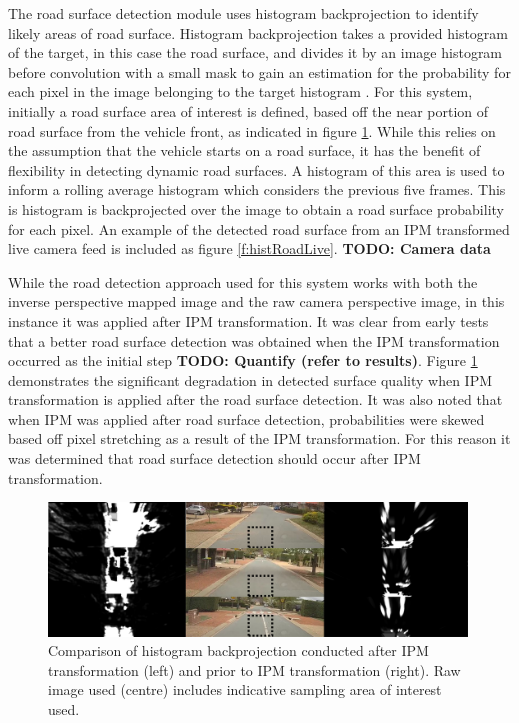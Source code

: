 \documentclass[]{aiaa-tc}%
\begin{document}
The road surface detection module uses histogram backprojection to identify likely areas of road surface. Histogram backprojection takes a provided histogram of the target, in this case the road surface, and divides it by an image histogram before convolution with a small mask to gain an estimation for the probability for each pixel in the image belonging to the target histogram \citep{histBackImageIndexing}. For this system, initially a road surface area of interest is defined, based off the near portion of road surface from the vehicle front, as indicated in figure \ref{f:histIPMcompare}. While this relies on the assumption that the vehicle starts on a road surface, it has the benefit of flexibility in detecting dynamic road surfaces. A histogram of this area is used to inform a rolling average histogram which considers the previous five frames. This is histogram is backprojected over the image to obtain a road surface probability for each pixel. An example of the detected road surface from an IPM transformed live camera feed is included as figure \ref{f:histRoadLive}. \textbf{TODO: Camera data}



While the road detection approach used for this system works with both the inverse perspective mapped image and the raw camera perspective image, in this instance it was applied after IPM transformation. It was clear from early tests that a better road surface detection was obtained when the IPM transformation occurred as the initial step \textbf{TODO: Quantify (refer to results)}. Figure \ref{f:histIPMcompare} demonstrates the significant degradation in detected surface quality when IPM transformation is applied after the road surface detection. It was also noted that when IPM was applied after road surface detection, probabilities were skewed based off pixel stretching as a result of the IPM transformation. For this reason it was determined that road surface detection should occur after IPM transformation.

\begin{figure}
	\includegraphics[width=0.99\textwidth]{RoadDetection/histIPMcompare.png}
	\caption{Comparison of histogram backprojection conducted after IPM transformation (left) and prior to IPM transformation (right). Raw image used (centre) includes indicative sampling area of interest used.}
	\label{f:histIPMcompare}
\end{figure}
\end{document}
